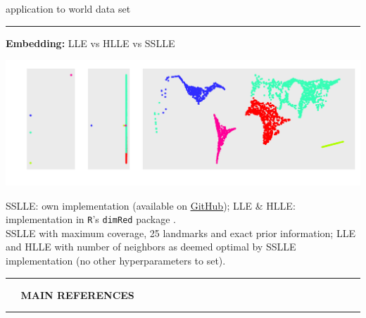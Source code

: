 \documentclass[11pt, compress, t, notes = noshow, xcolor = table, 
aspectratio = 1610]{beamer}
\newcommand{\highlight}[1]{\textcolor{highlightcol}{\textbf{#1}}}
\begin{document}

\LARGE
\begin{frame}[noframenumbering]{application to world data set}
\normalsize
\vspace{-0.5cm}
\noindent \textcolor{gray!90}{\rule{\textwidth}{1pt}}
\smallskip

\textbf{Embedding:} LLE vs HLLE vs SSLLE

\includegraphics[trim = 20 0 0 0, clip, %
  width = \textwidth]{figures/comparison_world}
  
\vfill

\scriptsize
SSLLE: own implementation (available on  
\href{https://github.com/lisa-wm/manifold-lle/tree/main/2_code}
{\underline{GitHub}}); 
LLE \& HLLE: implementation in \texttt{R}'s \texttt{dimRed} 
package \citep{pkgdimred}. \\
SSLLE with maximum coverage, 25 landmarks and exact prior information;
LLE and HLLE with number of neighbors as deemed optimal by SSLLE implementation 
(no other hyperparameters to set).


\end{frame}


\LARGE
\begin{frame}[noframenumbering]{\phantom{foo}}
\normalsize
\vspace{-0.5cm}
\noindent \textcolor{gray!90}{\rule{\textwidth}{1pt}}
\smallskip

\Huge
\hspace{0pt}
\vfill
\textbf{\highlight{~~ MAIN REFERENCES}}
\vfill
\hspace{0pt}

\noindent \textcolor{gray!90}{\rule{\textwidth}{1pt}}

\end{frame}
\end{document}
